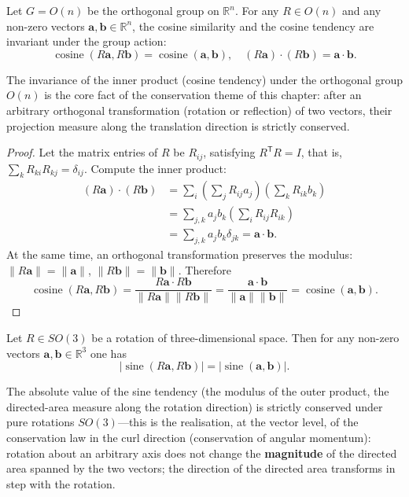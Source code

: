 \begin{proposition}\label{prop:cosine_scalar}
Let $G = O(n)$ be the orthogonal group on $\mathbb{R}^n$. For any $R \in O(n)$ and any non-zero vectors $\mathbf{a}, \mathbf{b} \in \mathbb{R}^n$, the cosine similarity and the cosine tendency are invariant under the group action:
\[\operatorname{cosine}(R\mathbf{a}, R\mathbf{b}) = \operatorname{cosine}(\mathbf{a}, \mathbf{b}), \quad (R\mathbf{a}) \cdot (R\mathbf{b}) = \mathbf{a} \cdot \mathbf{b}.\]

The invariance of the inner product (cosine tendency) under the orthogonal group $O(n)$ is the core fact of the conservation theme of this chapter: after an arbitrary orthogonal transformation (rotation or reflection) of two vectors, their projection measure along the translation direction is strictly conserved.
\end{proposition}

\begin{proof}
Let the matrix entries of $R$ be $R_{ij}$, satisfying $R^{\mathsf T}R = I$, that is, $\sum_k R_{ki}R_{kj} = \delta_{ij}$. Compute the inner product:
\begin{align*}
(R\mathbf{a}) \cdot (R\mathbf{b})
&= \sum_i \left( \sum_j R_{ij} a_j \right) \left( \sum_k R_{ik} b_k \right) \\
&= \sum_{j,k} a_j b_k \left( \sum_i R_{ij}R_{ik} \right) \\
&= \sum_{j,k} a_j b_k \delta_{jk}
= \mathbf{a} \cdot \mathbf{b}.
\end{align*}
At the same time, an orthogonal transformation preserves the modulus: $\|R\mathbf{a}\| = \|\mathbf{a}\|$, $\|R\mathbf{b}\| = \|\mathbf{b}\|$. Therefore
\[
\operatorname{cosine}(R\mathbf{a}, R\mathbf{b})
= \frac{R\mathbf{a} \cdot R\mathbf{b}}{\|R\mathbf{a}\| \|R\mathbf{b}\|}
= \frac{\mathbf{a} \cdot \mathbf{b}}{\|\mathbf{a}\| \|\mathbf{b}\|}
= \operatorname{cosine}(\mathbf{a}, \mathbf{b}).
\]
\end{proof}

\begin{proposition}\label{prop:sine_rotation}
Let $R \in SO(3)$ be a rotation of three-dimensional space. Then for any non-zero vectors $\mathbf{a},\mathbf{b} \in \mathbb{R}^3$ one has
\[\lvert\operatorname{sine}(R\mathbf{a}, R\mathbf{b})\rvert = \lvert\operatorname{sine}(\mathbf{a}, \mathbf{b})\rvert.\]

The absolute value of the sine tendency (the modulus of the outer product, the directed-area measure along the rotation direction) is strictly conserved under pure rotations $SO(3)$---this is the realisation, at the vector level, of the conservation law in the curl direction (conservation of angular momentum): rotation about an arbitrary axis does not change the \textbf{magnitude} of the directed area spanned by the two vectors; the direction of the directed area transforms in step with the rotation.
\end{proposition}

